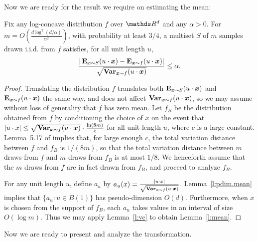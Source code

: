 Now we are ready for the result we require on estimating the mean:

\begin{lemma}
\label{l:mean}
Fix any log-concave distribution $f$ over $\R^d$
and any
$\alpha > 0$.
For $m = O\left(\frac{d \log^2(d/\alpha)}{\alpha^2}\right)$, 
 with probability at least $3/4$,
a multiset $S$ of $m$ samples drawn i.i.d. from $f$ 
satisfies, for all unit length $u$,
\begin{equation}
\label{e:mean}
\frac{| \operatorname{{\bf E}}_{\boldsymbol{x} \sim S}( u \cdot \boldsymbol{x}) - \operatorname{{\bf E}}_{\boldsymbol{x} \sim f}(u \cdot \boldsymbol{x})|}
     {\sqrt{\operatorname{{\bf Var}}_{\boldsymbol{x} \sim f}(u \cdot \boldsymbol{x})}}
 \leq \alpha.
\end{equation}
\end{lemma}
\begin{proof} Translating the distribution $f$ translates both $\operatorname{{\bf E}}_{\boldsymbol{x}
  \sim S}( u \cdot \boldsymbol{x})$ and $\operatorname{{\bf E}}_{\boldsymbol{x} \sim f}( u \cdot \boldsymbol{x})$ the same way,
and does not affect $\operatorname{{\bf Var}}_{\boldsymbol{x} \sim f}(u \cdot \boldsymbol{x})$, so we may assume without loss
of generality that $f$ has zero mean.  
Let $f_B$ be the distribution
obtained from $f$ by conditioning the choice of $x$ on the event that
$| u \cdot x | \leq \sqrt{\operatorname{{\bf Var}}_{\boldsymbol{x} \sim f}(u \cdot \boldsymbol{x})} \cdot \frac{\ln (8 m)}{c}$ for all unit length $u$, where $c$ is a large constant.
Lemma~5.17 of \citep{LovaszVempala07} implies that, for large
enough $c$, the total variation
distance between $f$ and $f_B$ is $1/(8m)$, so that the total variation
distance between $m$ draws from $f$ and $m$ draws from $f_B$ is at most
$1/8$.  We henceforth assume that the $m$ draws from $f$ are in fact drawn from $f_B$, and proceed to analyze $f_B$.

For any unit length $u$, define $a_u$ by 
$a_u(x) = \frac{| u \cdot x |}{\sqrt{\operatorname{{\bf Var}}_{\boldsymbol{x} \sim f}(u \cdot \boldsymbol{x})}}$.
Lemma~\ref{l:pdim.mean} implies that $\{ a_u : u \in B(1) \}$
has pseudo-dimension $O(d)$.  Furthermore, when $x$ is chosen
from the support of $f_B$, each $a_u$ takes values in 
an interval of size $O(\log m)$.  Thus we may apply Lemma~\ref{l:vc} to obtain
Lemma~\ref{l:mean}. 
\end{proof}

Now we are ready to present and analyze the transformation.

